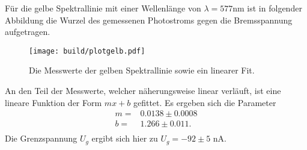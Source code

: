 \noindent
Für die gelbe Spektrallinie mit einer Wellenlänge von $\lambda = 577 \si{\nano\meter}$
ist in folgender Abbildung die Wurzel des gemessenen Photostroms gegen die Bremsspannung
aufgetragen.
\begin{figure}[H]
  \centering
  \texttt{[image: build/plotgelb.pdf]}
  \label{fig:plotgelb}
  \caption{Die Messwerte der gelben Spektrallinie sowie ein linearer Fit.}
\end{figure}
\noindent
An den Teil der Messwerte, welcher näherungsweise linear verläuft, ist eine lineare Funktion der Form $mx +b$ gefittet. Es ergeben sich die Parameter
\begin{align*}
  m = & 0.0138 \pm 0.0008 \\
  b = & 1.266 \pm 0.011.\\
\end{align*}
Die Grenzspannung $U_g$ ergibt sich hier zu $ U_g = -92 \pm 5$ \si{\nano\ampere}. \\
